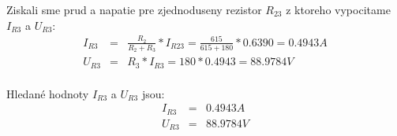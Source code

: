 \documentclass[a4paper,oneside,12pt]{article}
\begin{document}
	Ziskali sme prud a napatie pre zjednoduseny rezistor $R_{23}$ z ktoreho vypocitame $I_{R3}$ a $U_{R3}$:
	\begin{eqnarray*}
		I_{R3} &= & \frac{R_{2}}{R_{2} + R_{3}} * I_{R23} = \frac{615}{615 + 180} * 0.6390 = 0.4943 A\\
		U_{R3} &= & R_{3} * I_{R3} = 180 * 0.4943 = 88.9784 V\\
	\end{eqnarray*}

	Hledané hodnoty $I_{R3}$ a $U_{R3}$ jsou:
	\begin{eqnarray*}
		I_{R3} &= & 0.4943 A\\
		U_{R3} &= & 88.9784 V\\
	\end{eqnarray*}

	\newpage
\end{document}

